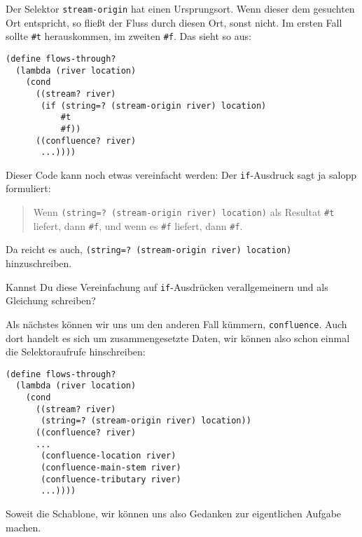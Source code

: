 %
Der Selektor \lstinline{stream-origin} hat einen Ursprungsort.  Wenn dieser dem
gesuchten Ort entspricht, so fließt der Fluss durch diesen Ort, sonst
nicht.  Im ersten Fall sollte \lstinline{#t} herauskommen, im zweiten
\lstinline{#f}.  Das sieht so aus:
%
\begin{lstlisting}
(define flows-through?
  (lambda (river location)
    (cond
      ((stream? river)
       (if (string=? (stream-origin river) location)
           #t
           #f))
      ((confluence? river)
       ...))))
\end{lstlisting}
%
Dieser Code kann noch etwas vereinfacht werden: Der
\lstinline{if}-Ausdruck sagt ja salopp formuliert:
%
\begin{quote}
  Wenn \lstinline{(string=? (stream-origin river) location)} als
  Resultat \lstinline{#t} liefert, dann \lstinline{#f}, und wenn es
  \lstinline{#f} liefert, dann \lstinline{#f}.
\end{quote}
%
Da reicht es auch, \lstinline{(string=? (stream-origin river) location)} hinzuschreiben.
%
\begin{aufgabe}\label{aufgabe:iftruefalse}
  Kannst Du diese Vereinfachung auf \lstinline{if}-Ausdrücken
  verallgemeinern und als Gleichung schreiben?
\end{aufgabe}
%
Als nächstes können wir uns um den anderen Fall kümmern,
\lstinline{confluence}.  Auch dort handelt es sich um
zusammengesetzte Daten, wir können also schon einmal die
Selektoraufrufe hinschreiben:
%
\begin{lstlisting}
(define flows-through?
  (lambda (river location)
    (cond
      ((stream? river)
       (string=? (stream-origin river) location))
      ((confluence? river)
      ...
       (confluence-location river)
       (confluence-main-stem river)
       (confluence-tributary river)
       ...))))
\end{lstlisting}
%
Soweit die Schablone, wir können uns also Gedanken zur eigentlichen
Aufgabe machen.


